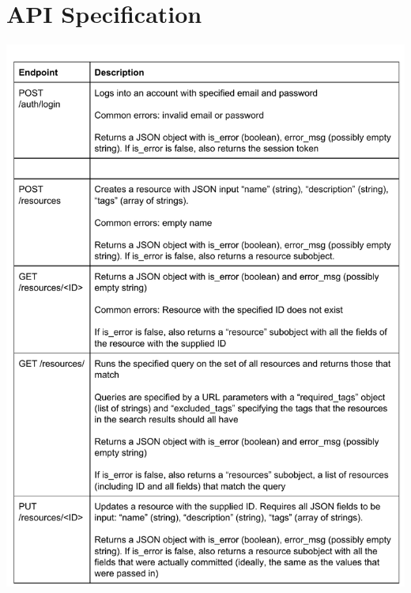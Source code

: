 \documentclass[12pt]{article}
\begin{document}
\section{API Specification}
\label{appendix:apispec}
\includegraphics[width=6in]{../ev3/apispec_01.pdf}
\end{document}
